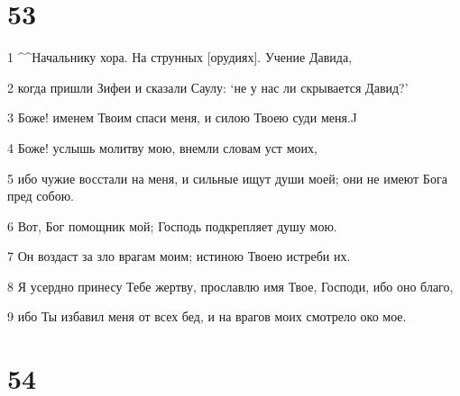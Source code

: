 \chapter{53}

\par 1 ^^Начальнику хора. На струнных [орудиях]. Учение Давида,
\par 2 когда пришли Зифеи и сказали Саулу: `не у нас ли скрывается Давид?'
\par 3 Боже! именем Твоим спаси меня, и силою Твоею суди меня.^^
\par 4 Боже! услышь молитву мою, внемли словам уст моих,
\par 5 ибо чужие восстали на меня, и сильные ищут души моей; они не имеют Бога пред собою.
\par 6 Вот, Бог помощник мой; Господь подкрепляет душу мою.
\par 7 Он воздаст за зло врагам моим; истиною Твоею истреби их.
\par 8 Я усердно принесу Тебе жертву, прославлю имя Твое, Господи, ибо оно благо,
\par 9 ибо Ты избавил меня от всех бед, и на врагов моих смотрело око мое.

\chapter{54}

